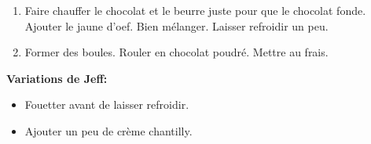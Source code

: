 
\begin{ingredients}
\end{ingredients}


\begin{recipe}
  \begin{enumerate}

  \item Faire chauffer le chocolat et le beurre juste pour que le
    chocolat fonde.  Ajouter le jaune d'oef.  Bien m\'elanger.
    Laisser refroidir un peu.
    
  \item Former des boules.  Rouler en chocolat poudr\'e.  Mettre au frais.

  \end{enumerate}

  \textbf{Variations de Jeff:}
  \begin{itemize}
  \item Fouetter avant de laisser refroidir.
  \item Ajouter un peu de cr\`eme chantilly.
  \end{itemize}
\end{recipe}
